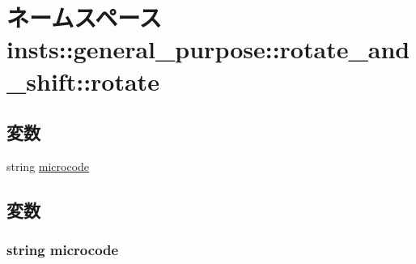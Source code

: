 \hypertarget{namespaceinsts_1_1general__purpose_1_1rotate__and__shift_1_1rotate}{
\section{ネームスペース insts::general\_\-purpose::rotate\_\-and\_\-shift::rotate}
\label{namespaceinsts_1_1general__purpose_1_1rotate__and__shift_1_1rotate}
}
\subsection*{変数}
\begin{DoxyCompactItemize}
\item 
string \hyperlink{namespaceinsts_1_1general__purpose_1_1rotate__and__shift_1_1rotate_a770f11a173e99389a8802f0107ed8f52}{microcode}
\end{DoxyCompactItemize}


\subsection{変数}
\hypertarget{namespaceinsts_1_1general__purpose_1_1rotate__and__shift_1_1rotate_a770f11a173e99389a8802f0107ed8f52}{
\subsubsection[{microcode}]{\setlength{\rightskip}{0pt plus 5cm}string {\bf microcode}}}
\label{namespaceinsts_1_1general__purpose_1_1rotate__and__shift_1_1rotate_a770f11a173e99389a8802f0107ed8f52}
